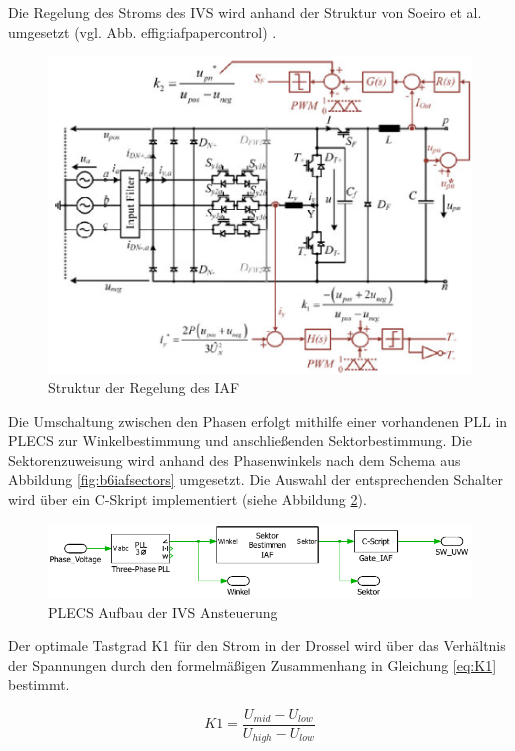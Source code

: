		
		Die Regelung des Stroms des IVS wird anhand der Struktur von Soeiro et al. umgesetzt (vgl. Abb. ef{fig:iafpapercontrol}) \cite{Soeiro.2013}. 
		 \begin{figure}[H]
			\centering
			\includegraphics[width=0.8\linewidth]{content/Grafiken/IAF_Paper_Control}
			\caption{Struktur der Regelung des IAF \cite{Soeiro.2013}}
			\label{fig:iafpapercontrol}
		\end{figure}
		Die Umschaltung zwischen den Phasen erfolgt mithilfe einer vorhandenen PLL in PLECS zur Winkelbestimmung und anschließenden Sektorbestimmung. Die Sektorenzuweisung wird anhand des Phasenwinkels nach dem Schema aus Abbildung \ref{fig:b6iafsectors} umgesetzt. Die Auswahl der entsprechenden Schalter wird über ein C-Skript implementiert (siehe Abbildung \ref{fig:plecsiafivscontrol}). 
		\begin{figure}[H]
			\centering
			\includegraphics[width=1\linewidth]{content/Grafiken/PlecsIAFivscontrol}
			\caption{PLECS Aufbau der \gls{IVS} Ansteuerung}
			\label{fig:plecsiafivscontrol}
		\end{figure}
		Der optimale Tastgrad K1 für den Strom in der Drossel wird über das Verhältnis der Spannungen durch den formelmäßigen Zusammenhang in Gleichung \ref{eq:K1} bestimmt. 
		

		
		\begin{equation}
			\label{eq:K1}
			K1 = \dfrac{U_{mid}- U_{low}}{U_{high} -U_{low}} 
		\end{equation}
		
